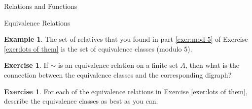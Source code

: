 \documentclass[11pt]{article}
\theoremstyle{definition}
\newtheorem{example}[theorem]{Example}
\newtheorem{exercise}[theorem]{Exercise}
\begin{document}
\begin{section}{Relations and Functions}
\begin{subsection}{Equivalence Relations}
\begin{example}
The set of relatives that you found in part \ref{exer:mod 5} of Exercise \ref{exer:lots of them} is the set of equivalence classes (modulo 5).
\end{example}

\begin{exercise}
If $\sim$ is an equivalence relation on a finite set $A$, then what is the connection between the equivalence classes and the corresponding digraph?
\end{exercise}

\begin{exercise}
For each of the equivalence relations in Exercise \ref{exer:lots of them}, describe the equivalence classes as best as you can.
\end{exercise}

\end{subsection}

\end{section}
\end{document}

